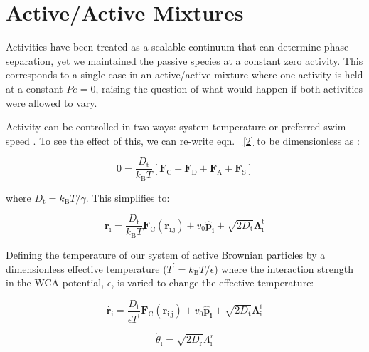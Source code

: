 \documentclass[11pt]{article}
\begin{document}
\section{Active/Active Mixtures}\label{activeactiveABPactivity}

Activities have been treated as a scalable continuum that can determine phase separation, yet we maintained the passive species at a constant zero activity.  This corresponds to a single case in an active/active mixture where one activity is held at a constant $Pe=0$, raising the question of what would happen if both activities were allowed to vary.  

Activity can be controlled in two ways: system temperature \cite{Stenhammar3, Stenhammar2, Wittkowski} or preferred swim speed \cite{Kolb}. To see the effect of this, we can re-write eqn. ~\ref{2} to be dimensionless as \cite{Preisler}:

\begin{equation}\label{74}
    0=\frac{D_\text{t}}{k_\text{B}T}\left[\boldsymbol{F}_{\text{C}}+\boldsymbol{F}_{\text{D}}+\boldsymbol{F}_{\text{A}}+\boldsymbol{F}_{\text{S}}\right]
\end{equation}

\noindent where $D_\text{t}=k_\text{B}T/\gamma$.  This simplifies to:

\begin{equation}\label{75}
        \dot{\boldsymbol{r}_{\text{i}}} =\frac{D_\text{t}}{k_\text{B}T} \boldsymbol{F}_{\text{C}}(\boldsymbol{r}_{\text{i,j}})+v_0\boldsymbol{\hat{p}_{\text{i}}}+\sqrt{2D_\text{t}}\boldsymbol{\Lambda}^{\text{t}}_{\text{i}}
\end{equation}

\noindent Defining the temperature of our system of active Brownian particles by a dimensionless effective temperature ($T^\prime = k_\text{B}T/\epsilon$) where the interaction strength in the WCA potential, $\epsilon$, is varied to change the effective temperature:

\begin{equation}\label{76}
        \dot{\boldsymbol{r}_{\text{i}}} =\frac{D_\text{t}}{\epsilon T^\prime} \boldsymbol{F}_{\text{C}}(\boldsymbol{r}_{\text{i,j}})+v_0\boldsymbol{\hat{p}_{\text{i}}}+\sqrt{2D_\text{t}}\boldsymbol{\Lambda}^{\text{t}}_{\text{i}}
\end{equation}

\begin{equation}\label{phi3}
    \dot{\theta}_{\text{i}} = \sqrt{2D_\text{r}}\Lambda^r_\text{i}
\end{equation}
\end{document}
